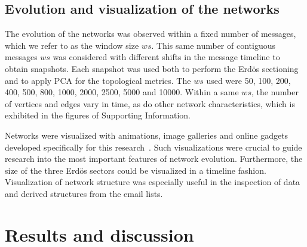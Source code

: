 \documentclass[%
	aip,
	jmp,%
	amsmath,amssymb,
	reprint,%
]{revtex4-1}
\begin{document}
\subsection{Evolution and visualization of the networks}\label{sec:viz}
The evolution of the networks was observed within a fixed number of messages, which we refer to as the window size $ws$. This same number of contiguous messages $ws$ was considered with different shifts in the message timeline to obtain snapshots. Each snapshot was used both to perform the Erd\"os sectioning and to apply PCA for the topological metrics.  
The $ws$ used were 50, 100, 200, 400, 500, 800, 1000, 2000, 2500, 5000 and 10000. Within a same $ws$, the number of vertices and edges vary in time, as do other network characteristics, which is exhibited in the figures of Supporting Information. 

Networks were visualized with animations, image galleries and online gadgets developed specifically for this research~\cite{animacoes,galGMANE,appGMANE}. Such visualizations were crucial to guide research into the most important features of network evolution. Furthermore, the size of the three Erd\"os sectors could be visualized in a timeline fashion. Visualization of network structure was especially useful in the inspection of data and derived structures from the email lists.

\section{Results and discussion}\label{sec:results}
\end{document}

